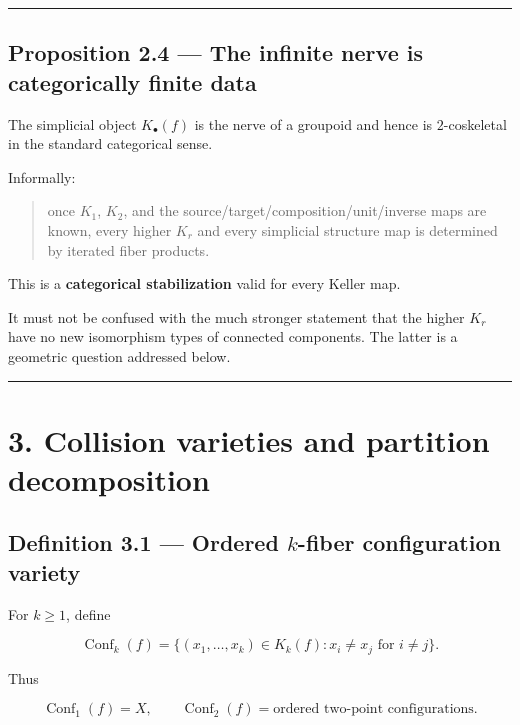 \begin{center}\rule{0.5\linewidth}{0.5pt}\end{center}

\subsection{Proposition 2.4 --- The infinite nerve is categorically
finite
data}\label{proposition-2.4-the-infinite-nerve-is-categorically-finite-data}

The simplicial object \(K_\bullet(f)\) is the nerve of a groupoid and
hence is \(2\)-coskeletal in the standard categorical sense.

Informally:

\begin{quote}
once \(K_1\), \(K_2\), and the source/target/composition/unit/inverse
maps are known, every higher \(K_r\) and every simplicial structure map
is determined by iterated fiber products.
\end{quote}

This is a \textbf{categorical stabilization} valid for every Keller map.

It must not be confused with the much stronger statement that the higher
\(K_r\) have no new isomorphism types of connected components. The
latter is a geometric question addressed below.

\begin{center}\rule{0.5\linewidth}{0.5pt}\end{center}

\section{3. Collision varieties and partition
decomposition}\label{collision-varieties-and-partition-decomposition}

\subsection{\texorpdfstring{Definition 3.1 --- Ordered \(k\)-fiber
configuration
variety}{Definition 3.1 --- Ordered k-fiber configuration variety}}\label{definition-3.1-ordered-k-fiber-configuration-variety}

For \(k\ge1\), define

\[
\operatorname{Conf}_k(f)=
\{(x_1,\dots,x_k)\in K_k(f):x_i\ne x_j\text{ for }i\ne j\}.
\]

Thus

\[
\operatorname{Conf}_1(f)=X,\qquad \operatorname{Conf}_2(f)=\text{ordered two-point configurations}.
\]

